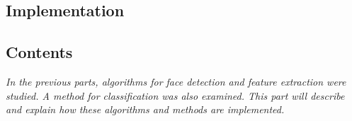   \begin{titlepage}
    \vspace*{\fill}
      \part{Implementation}
    \vspace*{\fill}
  \end{titlepage}

\startcontents[parts]

\chapter*{Contents}

\textit{In the previous parts, algorithms for face detection and feature extraction were studied. A method for classification was also examined. This part will describe and explain how these algorithms and methods are implemented.} 

\vspace{\baselineskip}


\pagebreak

\clearpage
\newpage

\clearpage
\newpage

\clearpage
\newpage


\stopcontents[parts]
